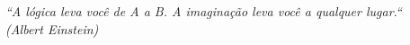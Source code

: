 \begin{epigrafe}
    \vspace*{\fill}
	\begin{flushright}
		\textit{``A lógica leva você de A a B. A imaginação leva você a qualquer lugar.``\\ 
		        (Albert Einstein)}
	\end{flushright}
\end{epigrafe}
